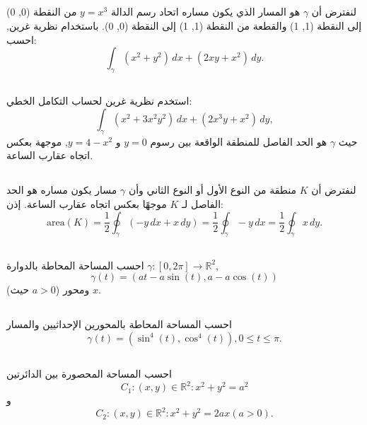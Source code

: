\subsection{}
لنفترض أن \( \gamma \) هو المسار الذي يكون مساره اتحاد رسم الدالة \( y = x^3 \) من النقطة (0, 0) إلى النقطة (1, 1) والقطعة من النقطة (1, 1) إلى النقطة (0, 0). باستخدام نظرية غرين, احسب:
\[ \int_{\gamma} (x^2 + y^2) \, dx + (2xy + x^2) \, dy. \]
\subsection{}
استخدم نظرية غرين لحساب التكامل الخطي:
\[ 
\int_{\gamma} (x^2 + 3x^2y^2) \, dx + (2x^3y + x^2) \, dy, 
\]
حيث \( \gamma \) هو الحد الفاصل للمنطقة الواقعة بين رسوم \( y = 0 \) و \( y = 4 - x^2 \), موجهة بعكس اتجاه عقارب الساعة.
\subsection{}
لنفترض أن \( K \) منطقة من النوع الأول أو النوع الثاني وأن \( \gamma \) مسار يكون مساره هو الحد الفاصل لـ \( K \) موجهًا بعكس اتجاه عقارب الساعة. إذن:
\[ \text{area}(K) = \frac{1}{2} \oint_{\gamma} (-y \, dx + x \, dy) = \frac{1}{2} \oint_{\gamma} -y \, dx = \frac{1}{2} \oint_{\gamma} x \, dy. \]
\subsection{}
احسب المساحة المحاطة بالدوارة \( \gamma : [0, 2\pi] \to \mathbb{R}^2 \),
\[ \gamma(t) = (at - a\sin(t), a - a\cos(t)) \]
(حيث \( a > 0 \)) ومحور \( x \).
\subsection{}
احسب المساحة المحاطة بالمحورين الإحداثيين والمسار
\[ \gamma(t) = (\sin^4(t), \cos^4(t)), 0 \leq t \leq \pi. \]
\subsection{}
احسب المساحة المحصورة بين الدائرتين
\[ C_1: (x, y) \in \mathbb{R}^2 : x^2 + y^2 = a^2 \]
و
\[ C_2: (x, y) \in \mathbb{R}^2 : x^2 + y^2 = 2ax  ( a > 0 ). \]
